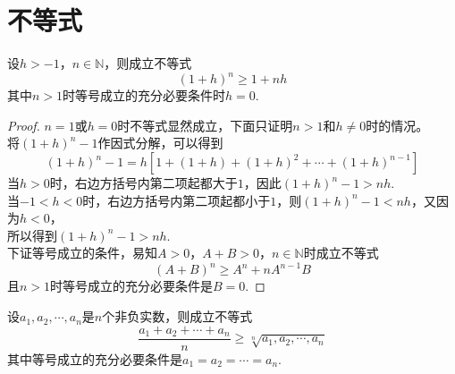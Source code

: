 \section{不等式}

\begin{theorem}[Bernoulli不等式]

    设$h>-1$，$n\in\mathbb{N}$，则成立不等式
    $$(1+h)^n\geq1+nh$$
    其中$n>1$时等号成立的充分必要条件时$h=0$.

\end{theorem}

\begin{proof}
    
    $n=1$或$h=0$时不等式显然成立，下面只证明$n>1$和$h\neq 0$时的情况。\\
    将$(1+h)^n-1$作因式分解，可以得到
    $$(1+h)^n-1=h[1+(1+h)+(1+h)^2+\cdots+(1+h)^{n-1}]$$
    当$h>0$时，右边方括号内第二项起都大于$1$，因此$(1+h)^n-1>nh$.\\
    当$-1<h<0$时，右边方括号内第二项起都小于$1$，则$(1+h)^n-1<nh$，又因为$h<0$，\\
    所以得到$(1+h)^n-1>nh$.\\
    下证等号成立的条件，易知$A>0$，$A+B>0$，$n\in\mathbb{N}$时成立不等式
    $$(A+B)^n\geq A^n + nA^{n-1}B$$
    且$n>1$时等号成立的充分必要条件是$B=0$.

\end{proof}

\begin{theorem}
    
    设$a_1,a_2,\cdots,a_n$是$n$个非负实数，则成立不等式
    $$\dfrac{a_1+a_2+\cdots+a_n}{n}\geq \sqrt[n]{a_1,a_2,\cdots,a_n}$$
    其中等号成立的充分必要条件是$a_1=a_2=\cdots=a_n$.

\end{theorem}


